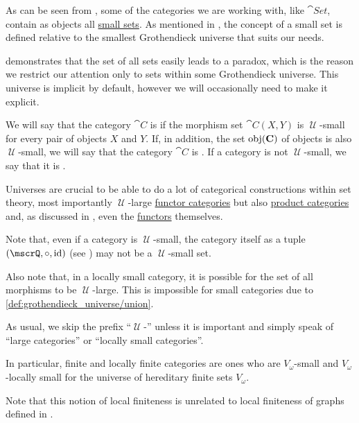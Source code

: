 \begin{definition}\label{def:category_size}
  As can be seen from , some of the categories we are working with, like \( \cat{Set} \), contain as objects all \hyperref[def:large_and_small_sets]{small sets}. As mentioned in , the concept of a small set is defined relative to the smallest Grothendieck universe that suits our needs.

   demonstrates that the set of all sets easily leads to a paradox, which is the reason we restrict our attention only to sets within some Grothendieck universe. This universe is implicit by default, however we will occasionally need to make it explicit.

  We will say that the category \( \cat{C} \) is  if the morphism set \( \cat{C}(X, Y) \) is \( \mscrU \)-small for every pair of objects \( X \) and \( Y \). If, in addition, the set \( \operatorname{obj}(\operatorname{\mathbf{C}}) \) of objects is also \( \mscrU \)-small, we will say that the category \( \cat{C} \) is . If a category is not \( \mscrU \)-small, we say that it is .

  Universes are crucial to be able to do a lot of categorical constructions within set theory, most importantly \( \mscrU \)-large \hyperref[def:functor_category]{functor categories} but also \hyperref[def:product_category]{product categories} and, as discussed in , even the \hyperref[def:functors]{functors} themselves.

  Note that, even if a category is \( \mscrU \)-small, the category itself as a tuple \( (\mscrQ, \bincirc, \id) \) (see ) may not be a \( \mscrU \)-small set.

  Also note that, in a locally small category, it is possible for the set of all morphisms to be \( \mscrU \)-large. This is impossible for small categories due to \ref{def:grothendieck_universe/union}.

  As usual, we skip the prefix \enquote{\( \mscrU \)-} unless it is important and simply speak of \enquote{large categories} or \enquote{locally small categories}.

  In particular, finite and locally finite categories are ones who are \( V_\omega \)-small and \( V_\omega \)-locally small for the universe of hereditary finite sets \hyperref[def:universe_of_hereditary_finite_sets]{\( V_\omega \)}.

  Note that this notion of local finiteness is unrelated to local finiteness of graphs defined in .
\end{definition}

